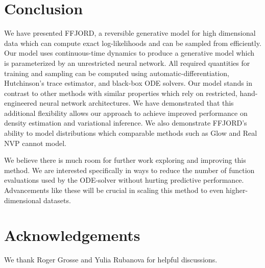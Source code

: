 \documentclass{article} %
\newcommand{\methodname}{FFJORD\xspace}
\newcommand\0{\kern-1.2pt\vec{\kern1.2pt 0}}
\begin{document}
\section{Conclusion}
We have presented \methodname, a reversible generative model for high dimensional data which can compute exact log-likelihoods and can be sampled from efficiently.
Our model uses continuous-time dynamics to produce a generative model which is parameterized by an unrestricted neural network.
All required quantities for training and sampling can be computed using automatic-differentiation, Hutchinson's trace estimator, and black-box ODE solvers.
Our model stands in contrast to other methods with similar properties which rely on restricted, hand-engineered neural network architectures.
We have demonstrated that this additional flexibility allows our approach to achieve improved performance on density estimation and variational inference. We also demonstrate \methodname's ability to model distributions which comparable methods such as Glow and Real NVP cannot model. 

We believe there is much room for further work exploring and improving this method. We are interested specifically in ways to reduce the number of function evaluations used by the ODE-solver without hurting predictive performance. Advancements like these will be crucial in scaling this method to even higher-dimensional datasets.  

\section{Acknowledgements}
We thank Roger Grosse and Yulia Rubanova for helpful discussions. 



\end{document}
